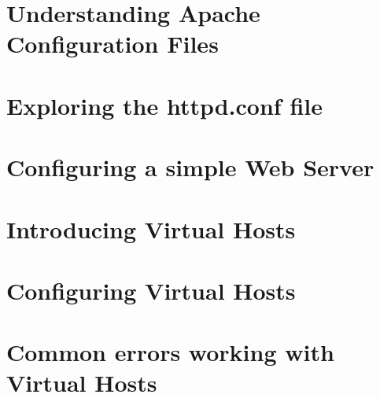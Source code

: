
\usepackage{minted}
\usepackage{booktabs}


	
	
	\section{Understanding Apache Configuration Files}
	
	
	\section{Exploring the httpd.conf file}
	\section{Configuring a simple Web Server}
	\section{Introducing Virtual Hosts}
	\section{Configuring Virtual Hosts}
	\section{Common errors working with Virtual Hosts}
	



